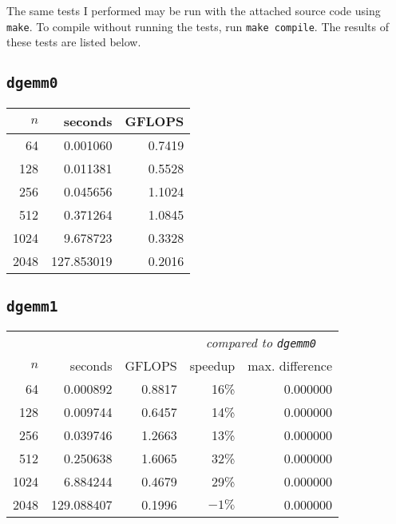 \documentclass[12pt,letterpaper,oneside]{article}
\begin{document}
The same tests I performed may be run with the attached source code using \texttt{make}. To compile without running the tests,
run \texttt{make compile}.
The results of these tests are listed below.
\begin{center}
    \subsection*{\texttt{dgemm0}}
    \label{results0}
    \begin{tabular}{r r r}
        $n$ & seconds & GFLOPS \\
        \hline
        64 & 0.001060 & 0.7419 \\
        128 & 0.011381 & 0.5528 \\
        256 & 0.045656 & 1.1024 \\
        512 & 0.371264 & 1.0845 \\
        1024 & 9.678723 & 0.3328 \\
        2048 & 127.853019 & 0.2016
    \end{tabular}

    \subsection*{\texttt{dgemm1}}
    \label{results1}
    \begin{tabular}{r r r r r} 
        \multicolumn{3}{c}{} & \multicolumn{2}{c}{\textit{compared to \texttt{dgemm0}}} \\
        $n$ & seconds & GFLOPS & speedup & max. difference \\
        \hline
        64 & 0.000892 & 0.8817 & 16\% & 0.000000 \\
        128 & 0.009744 & 0.6457 & 14\% & 0.000000 \\
        256 & 0.039746 & 1.2663 & 13\% & 0.000000 \\
        512 & 0.250638 & 1.6065 & 32\% & 0.000000 \\
        1024 & 6.884244 & 0.4679 & 29\% & 0.000000 \\
        2048 & 129.088407 & 0.1996 & $-1\%$ & 0.000000
    \end{tabular}
    

\end{center}
\end{document}
